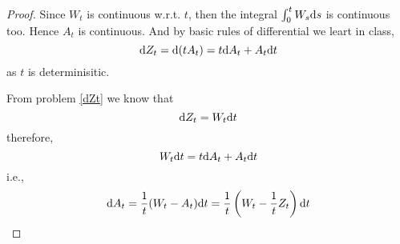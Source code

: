 \documentclass{homework}
\begin{document}
    \problem
    \begin{proof}
        Since $W_t$ is continuous w.r.t. $t$, then the
        integral $\int_0^tW_s\mathrm d s$ is continuous too.
        Hence $A_t$ is continuous. And by basic rules of
        differential we leart in class,
        \[\mathrm d Z_t=\mathrm d(tA_t)=t\mathrm d A_t+A_t\mathrm d t\]
        as $t$ is determinisitic.

        From problem \ref{dZt} we know that
        \[\mathrm d Z_t=W_t\mathrm d t\]
        therefore,
        \[W_t\mathrm d t=t\mathrm d A_t+A_t\mathrm d t\]
        i.e.,
        \[\mathrm d A_t=\frac{1}{t}(W_t-A_t)\mathrm d t
        =\frac{1}{t}\left(W_t-\frac{1}{t}Z_t\right)\mathrm d t\]
    \end{proof}
\end{document}
